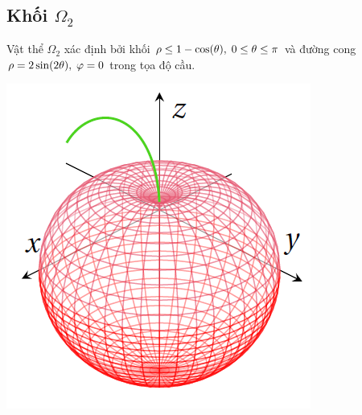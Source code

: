 \documentclass[12pt,a4paper]{article}
\begin{document}
\subsection{Khối $\Omega_2$}
Vật thể $\Omega_2$ xác định bởi khối $\rho \leq 1 - \cos(\theta), \thickspace 0 \leq \theta \leq \pi$ và đường cong $\rho = 2\sin(2\theta), \thickspace \varphi = 0$ trong tọa độ cầu.

\begin{center}
    \includegraphics*[scale = 0.5]{2.png}
\end{center}
\end{document}
